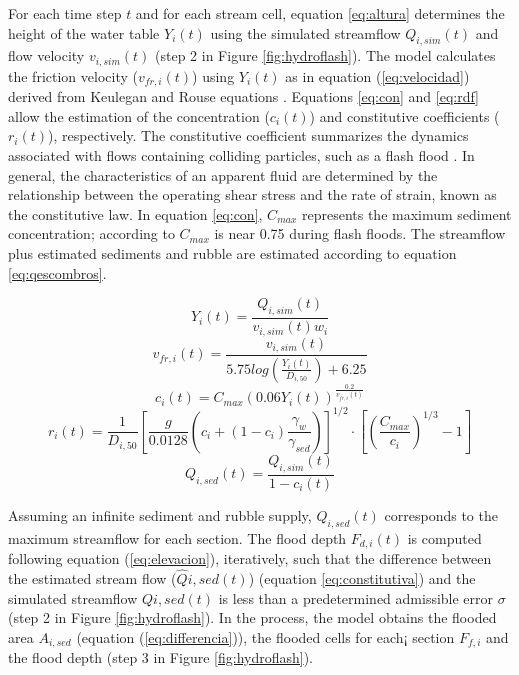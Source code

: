 \documentclass[hess, manuscript]{copernicus}
\begin{document}
For each time step $t$ and for each stream cell, equation \ref{eq:altura} determines the height of the water table $Y_{i}(t)$ using the simulated streamflow $Q_{i,sim}(t)$ and flow velocity $v_{i,sim}(t)$ (step 2 in Figure \ref{fig:hydroflash}). The model calculates the friction velocity ($v_{fr,i}(t)$) using $Y_i(t)$ as in equation (\ref{eq:velocidad}) derived from Keulegan and Rouse equations \citep{takahashi1991, Savage1984}. Equations \ref{eq:con} and \ref{eq:rdf} allow the estimation of the concentration ($c_{i}(t)$) and constitutive coefficients ($r_{i}(t)$), respectively. The constitutive coefficient summarizes the dynamics associated with flows containing colliding particles, such as a flash flood \citep{takahashi1991}. In general, the characteristics of an apparent fluid are determined by the relationship between the operating shear stress and the rate of strain, known as the constitutive law. In equation \ref{eq:con}, $C_{max}$ represents the maximum sediment concentration; according to \citet{Obrien1988} $C_{max}$ is near 0.75 during flash floods. The streamflow plus estimated sediments and rubble are estimated according to equation \ref{eq:qescombros}.

\begin{equation}
 Y_i(t) = \frac{Q_{i,sim}(t)}{v_{i,sim}(t) w_{i}}
 \label{eq:altura}
\end{equation}
\begin{equation}
 v_{fr,i}(t) = \frac{v_{i,sim}(t)}{5.75 log \left( \frac{Y_{i}(t)}{D_{i,50}} \right) + 6.25}
 \label{eq:velocidad}
\end{equation}
\begin{equation}
 c_{i}(t) = C_{max} (0.06 Y_{i}(t))^{\frac{0.2}{v_{fr,i}(t)}}
 \label{eq:con}
\end{equation}
\begin{equation}
r_{i}(t) = \frac{1}{D_{i,50}} \left [ \frac{g}{0.0128} \left( c_i+(1-c_i) \frac{\gamma_w}{\gamma_{sed}} \right ) \right ]^{1/2} \cdot \left[ \left( \frac{C_{max}}{c_i} \right )^{1/3} -1\right ]
 \label{eq:rdf}
\end{equation}
\begin{equation}
 Q_{i,sed}(t) = \frac{Q_{i,sim}(t)}{1-c_i(t)}
 \label{eq:qescombros}
\end{equation}

Assuming an infinite sediment and rubble supply, $Q_{i,sed}(t)$ corresponds to the maximum streamflow for each section.  The flood depth $F_{d,i}(t)$ is computed following equation (\ref{eq:elevacion}), iteratively, such that the difference between the estimated stream flow ($\hat{Q}{{i,sed}(t)}$) (equation \ref{eq:constitutiva}) and the simulated streamflow $Q{i,sed}(t)$ is less than a predetermined admissible error $\sigma$ (step 2 in Figure \ref{fig:hydroflash}). In the process, the model obtains the flooded area $A_{i,sed}$ (equation (\ref{eq:differencia})), the flooded cells for each¡ section $F_{f,i}$ and the flood depth (step 3 in Figure \ref{fig:hydroflash}).  
\end{document}
